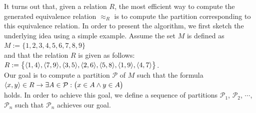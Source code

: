 It turns out that, given a relation $R$, the most efficient way to compute the generated equivalence
relation $\approx_R$ is to compute the partition corresponding to this equivalence relation.  In
order to present the algorithm, we first sketch the underlying idea using a simple example.  Assume
the set $M$ is defined as
\\
\hspace*{1.3cm}
$M := \{ 1,2,3,4,5,6,7,8,9 \}$
\\[0.2cm]
and that the relation $R$ is given as follows:
\\[0.2cm]
\hspace*{1.3cm}
$R := \bigl\{ \pair(1,4), \pair(7,9), \pair(3,5), \pair(2,6), \pair(5,8), \pair(1,9), \pair(4,7) \bigr\}$.
\\[0.2cm]
Our goal is to compute a partition $\mathcal{P}$ of $M$ such that the formula
\\[0.2cm]
\hspace*{1.3cm}
$\pair(x, y) \in R \rightarrow \exists A \in \mathcal{P}:\bigl(x \in A \wedge y \in A\bigr)$
\\[0.2cm]
holds.  In order to achieve this goal, we define a sequence of partitions $\mathcal{P}_1$,
$\mathcal{P}_2$, $\cdots$, $\mathcal{P}_n$ such that $\mathcal{P}_n$ achieves our goal.
